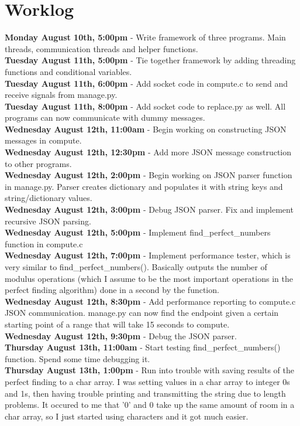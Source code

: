 \documentclass[11pt]{article}
\begin{document}
\section{Worklog}
\textbf{Monday August 10th, 5:00pm} - Write framework of three programs. Main threads, communication threads and helper functions.\\
\textbf{Tuesday August 11th, 5:00pm} - Tie together framework by adding threading functions and conditional variables.\\
\textbf{Tuesday August 11th, 6:00pm} - Add socket code in compute.c to send and receive signals from manage.py.\\
\textbf{Tuesday August 11th, 8:00pm} - Add socket code to replace.py as well. All programs can now communicate with dummy messages.\\
\textbf{Wednesday August 12th, 11:00am} - Begin working on constructing JSON messages in compute.\\
\textbf{Wednesday August 12th, 12:30pm} - Add more JSON message construction to other programs.\\
\textbf{Wednesday August 12th, 2:00pm} - Begin working on JSON parser function in manage.py. Parser creates dictionary and populates it with string keys and string/dictionary values.\\
\textbf{Wednesday August 12th, 3:00pm} - Debug JSON parser. Fix and implement recursive JSON parsing.\\
\textbf{Wednesday August 12th, 5:00pm} - Implement find\_perfect\_numbers function in compute.c\\
\textbf{Wednesday August 12th, 7:00pm} - Implement performance tester, which is very similar to find\_perfect\_numbers(). Basically outputs the number of modulus operations (which I assume to be the most important operations in the perfect finding algorithm) done in a second by the function.\\
\textbf{Wednesday August 12th, 8:30pm} - Add performance reporting to compute.c JSON communication. manage.py can now find the endpoint given a certain starting point of a range that will take 15 seconds to compute.\\
\textbf{Wednesday August 12th, 9:30pm} - Debug the JSON parser.\\
\textbf{Thursday August 13th, 11:00am} - Start testing find\_perfect\_numbers() function. Spend some time debugging it.\\
\textbf{Thursday August 13th, 1:00pm} - Run into trouble with saving results of the perfect finding to a char array. I was setting values in a char array to integer 0s and 1s, then having trouble printing and transmitting the string due to length problems. It occured to me that '0' and 0 take up the same amount of room in a char array, so I just started using characters and it got much easier.\\
\end{document}
